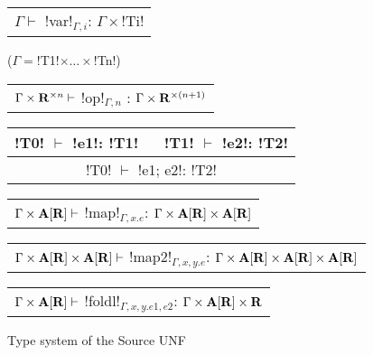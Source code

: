 \begin{figure*}[tb]
    \centering
    \begin{tabular}{c} 
    \\\hline
    $\Gamma \vdash$ !var!$_{\Gamma,i}$: $\Gamma\times$!Ti!
    \end{tabular}($\Gamma=$!T1!$\times\ldots\times$!Tn!)
    \hspace{0.5cm}
    \begin{tabular}{c}
        \\\hline
        $\Gamma\times\mathbf{R}^{\times n} \vdash$ !op!$_{\Gamma,n}$ : $\Gamma\times\mathbf{R}^{\times(n+1)}$
    \end{tabular}

    \begin{tabular}{c}
    !T0! $\vdash$ !e1!: !T1! $\quad$ !T1! $\vdash$ !e2!: !T2! \\\hline
    !T0! $\vdash$ !e1; e2!: !T2!
    \end{tabular}
    \hspace{0.5cm}
    \begin{tabular}{c}
        \\\hline  
        $\Gamma \times \mathbf{A}[\mathbf{R}] \vdash$ !map!$_{\Gamma, x.e}$: $\Gamma \times \mathbf{A}[\mathbf{R}] \times \mathbf{A}[\mathbf{R}]$
    \end{tabular}

    \begin{tabular}{c}
        \\\hline  
        $\Gamma \times \mathbf{A}[\mathbf{R}] \times \mathbf{A}[\mathbf{R}] \vdash$ !map2!$_{\Gamma, x,y.e}$: $\Gamma \times \mathbf{A}[\mathbf{R}] \times \mathbf{A}[\mathbf{R}] \times \mathbf{A}[\mathbf{R}]$
    \end{tabular}

    \begin{tabular}{c}
        \\\hline  
        $\Gamma \times \mathbf{A}[\mathbf{R}] \vdash$ !foldl!$_{\Gamma, x,y.e1, e2}$: $\Gamma \times \mathbf{A}[\mathbf{R}] \times \mathbf{R}$
    \end{tabular}
    \vspace{-0.2cm}
    \caption{Type system of the Source UNF}
    \vspace{-0.4cm}
    \label{fig:source_unf_typesystem}
    \end{figure*}